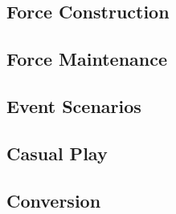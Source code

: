 

\subsection{Force Construction}
\label{subsec:event_force_construction}



\subsection{Force Maintenance}
\label{subsec:event_force_maintenance}



\subsection{Event Scenarios}



\subsection{Casual Play}



\subsection{Conversion}



